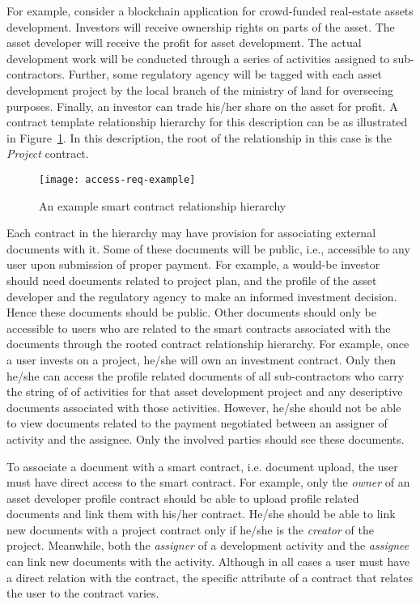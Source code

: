 For example, consider a blockchain application for crowd-funded real-estate assets development. Investors will receive ownership rights on parts of the asset. The asset developer will receive the profit for asset development. The actual development work will be conducted through a series of activities assigned to sub-contractors. Further, some regulatory agency will be tagged with each asset development project by the local branch of the ministry of land for overseeing purposes. Finally, an investor can trade his/her share on the asset for profit. A contract template relationship hierarchy for this description can be as illustrated in Figure~\ref{fig-2}. In this description, the root of the relationship in this case is the {\it Project} contract.
\begin{figure}[h]
\centering
\texttt{[image: access-req-example]}                    
\caption{An example smart contract relationship hierarchy}\label{fig-2}
\end{figure}
Each contract in the hierarchy may have provision for associating external documents with it. Some of these documents will be public, i.e., accessible to any user upon submission of proper payment. For example, a would-be investor should need documents related to project plan, and the profile of the asset developer and the regulatory agency to make an informed investment decision. Hence these documents should be public. Other documents should only be accessible to users who are related to the smart contracts associated with the documents through the rooted contract relationship hierarchy. For example, once a user invests on a project, he/she will own an investment contract. Only then he/she can access the profile related documents of all sub-contractors who carry the string of of activities for that asset development project and any descriptive documents associated with those activities. However, he/she should not be able to view documents related to the payment negotiated between an assigner of activity and the assignee. Only the involved parties should see these documents.    

To associate a document with a smart contract, i.e. document upload, the user must have direct access to the smart contract. For example, only the {\it owner} of an asset developer profile contract should be able to upload profile related documents and link them with his/her contract. He/she should be able to link new documents with a project contract only if he/she is the {\it creator} of the project. Meanwhile, both the {\it assigner} of a development activity and the {\it assignee} can link new documents with the activity. Although in all cases a user must have a direct relation with the contract, the specific attribute of a contract that relates the user to the contract varies.   

